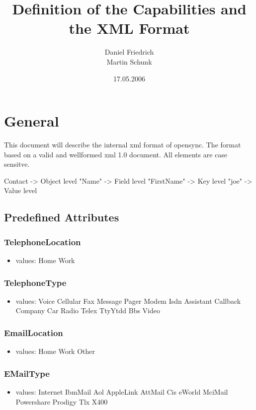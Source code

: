 \documentclass[a4paper,11pt]{article}
\title{Definition of the Capabilities and the XML Format}
\author{Daniel Friedrich \\
	Martin Schunk}
\date{17.05.2006}
\begin{document}
\maketitle
\tableofcontents

\section{General}
This document will describe the internal xml format of opensync.
The format based on a valid and wellformed xml 1.0 document.
All elements are case sensitve.

Contact -> Object level
"Name" -> Field level
"FirstName" -> Key level
"joe" -> Value level

\subsection{Predefined Attributes}
\subsubsection{TelephoneLocation}
\begin{itemize}
  \item values:
  \subitem Home
  \subitem Work
\end{itemize}

\subsubsection{TelephoneType}
\begin{itemize}
  \item values:
  \subitem Voice
  \subitem Cellular
  \subitem Fax
  \subitem Message
  \subitem Pager
  \subitem Modem
  \subitem Isdn
  \subitem Assistant
  \subitem Callback
  \subitem Company
  \subitem Car
  \subitem Radio
  \subitem Telex
  \subitem TtyYtdd
  \subitem Bbs
  \subitem Video
\end{itemize}

\subsubsection{EmailLocation}
\begin{itemize}
  \item values:
  \subitem Home
  \subitem Work
  \subitem Other
\end{itemize}

\subsubsection{EMailType}
\begin{itemize}
  \item values:
  \subitem Internet
  \subitem IbmMail
  \subitem Aol
  \subitem AppleLink
  \subitem AttMail
  \subitem Cis
  \subitem eWorld
  \subitem MciMail
  \subitem Powershare
  \subitem Prodigy
  \subitem Tlx
  \subitem X400
\end{itemize}
\end{document}
